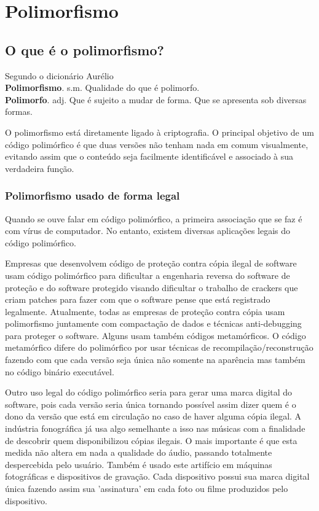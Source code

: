 \chapter{Polimorfismo}

\section{O que é o polimorfismo?}

	Segundo o dicionário Aurélio\cite{Aurelio:1}\\
\textbf{Polimorfismo}. s.m. Qualidade do que é polimorfo.\\
\textbf{Polimorfo}. adj. Que é sujeito a mudar de forma. Que se apresenta sob diversas formas.


O polimorfismo está diretamente ligado à criptografia. O principal objetivo de um código polimórfico é que duas versões não tenham nada em comum visualmente, evitando assim que o conteúdo seja facilmente identificável e associado à sua verdadeira função. 

\subsection{Polimorfismo usado de forma legal}
Quando se ouve falar em código polimórfico, a primeira associação que se faz é com vírus de computador. No entanto, existem diversas aplicações legais do código polimórfico.

Empresas que desenvolvem código de proteção contra cópia ilegal de software usam código polimórfico para dificultar a engenharia reversa do software de proteção e do software protegido visando dificultar o trabalho de crackers que criam patches para fazer com que o software pense que está registrado legalmente\cite{soft:1,soft:2}. Atualmente, todas as empresas de proteção contra cópia usam polimorfismo juntamente com compactação de dados e técnicas anti-debugging para proteger o software. Alguns usam também códigos metamórficos. O código metamórfico difere do polimórfico por usar técnicas de recompilação/reconstrução fazendo com que cada versão seja única não somente na aparência mas também no código binário executável.

Outro uso legal do código polimórfico seria para gerar uma marca digital do software, pois cada versão seria única tornando possível assim dizer quem é o dono da versão que está em circulação no caso de haver alguma cópia ilegal. A indústria fonográfica já usa algo semelhante a isso nas músicas\cite{wiki:3} com a finalidade de descobrir quem disponibilizou cópias ilegais. O mais importante é que esta medida não altera em nada a qualidade do áudio, passando totalmente despercebida pelo usuário. Também é usado este artifício em máquinas fotográficas e dispositivos de gravação. Cada dispositivo possui sua marca digital única fazendo assim sua 'assinatura' em cada foto ou filme produzidos pelo dispositivo.

